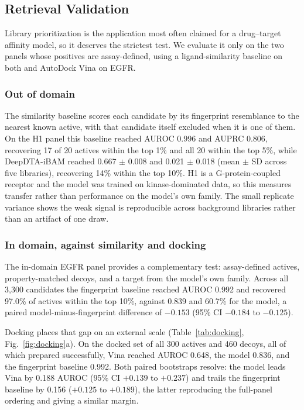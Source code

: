 \documentclass{ieeeaccess}
\begin{document}
\subsection{Retrieval Validation}
\label{sec:retrieval}
Library prioritization is the application most often claimed for a drug--target
affinity model, so it deserves the strictest test. We evaluate it only on the
two panels whose positives are assay-defined, using a ligand-similarity
baseline on both and AutoDock Vina on EGFR.

\subsubsection{Out of domain}
The similarity baseline scores each candidate by its fingerprint resemblance to
the nearest known active, with that candidate itself excluded when it is one of
them. On the H1 panel this baseline reached AUROC 0.996 and
AUPRC 0.806, recovering 17 of 20 actives within the top 1\% and all 20 within
the top 5\%, while DeepDTA-iBAM reached 0.667 $\pm$ 0.008 and
0.021 $\pm$ 0.018 (mean $\pm$ SD across five libraries), recovering 14\%
within the top 10\%. H1 is a G-protein-coupled receptor and the model was trained on
kinase-dominated data, so this measures transfer rather than performance on the
model's own family. The small replicate variance shows the weak signal is
reproducible across background libraries rather than an artifact of one draw.

\subsubsection{In domain, against similarity and docking}
The in-domain EGFR panel provides a complementary test: assay-defined actives,
property-matched decoys, and a target from the model's own family. Across all
3{,}300 candidates the fingerprint baseline reached AUROC 0.992 and recovered
97.0\% of actives within the top 10\%, against 0.839 and 60.7\% for the model,
a paired model-minus-fingerprint difference of $-0.153$ (95\% CI $-0.184$ to $-0.125$).

Docking places that gap on an external scale (Table~\ref{tab:docking},
Fig.~\ref{fig:docking}a). On the docked set of all 300 actives and 460 decoys,
all of which prepared successfully, Vina reached AUROC 0.648, the model 0.836,
and the fingerprint baseline 0.992. Both paired bootstraps resolve: the model
leads Vina by 0.188 AUROC (95\% CI $+0.139$ to $+0.237$) and trails the
fingerprint baseline by 0.156 ($+0.125$ to $+0.189$), the latter reproducing the
full-panel ordering and giving a similar margin.
\end{document}
